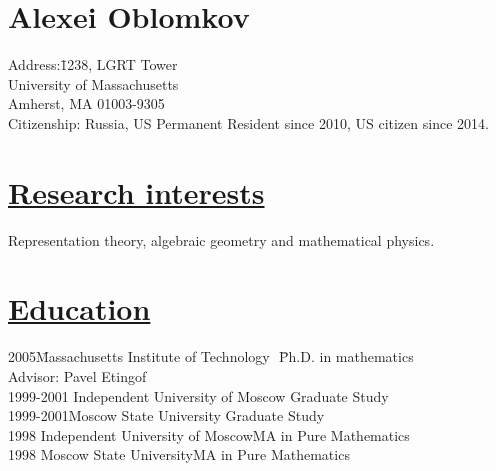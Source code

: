\documentclass[11pt]{amsart}
\theoremstyle{plain}
\theoremstyle{definition}
\theoremstyle{remark}
\begin{document}
\section*{\bf{\huge Alexei Oblomkov}}
\bigskip



\begin{tabbing}
Address:\quad\quad\quad\;\= 1238, LGRT Tower\\
                      \>University of Massachusetts\\
\>  Amherst, MA 01003-9305\\

Citizenship:\> Russia, US Permanent Resident since 2010, US citizen since 2014.
\end{tabbing}

\section*{\Large\underline{Research interests}}



\noindent Representation theory, algebraic geometry
and mathematical physics.




\section*{\Large\underline{Education}}
\begin{tabbing}
2005\quad\quad\quad\quad\quad\= Massachusetts Institute of
Technology   \quad\quad\,\,\:\:\:\:\= Ph.D. in
mathematics\\
\>\quad\quad  \>  Advisor: Pavel Etingof\\
1999-2001\> Independent University of
Moscow\> Graduate Study\\
1999-2001\>Moscow State University\> Graduate Study\\

1998\> Independent University of Moscow\>MA in Pure Mathematics\\
1998\> Moscow State University\>MA in Pure Mathematics
\end{tabbing}
\end{document}
